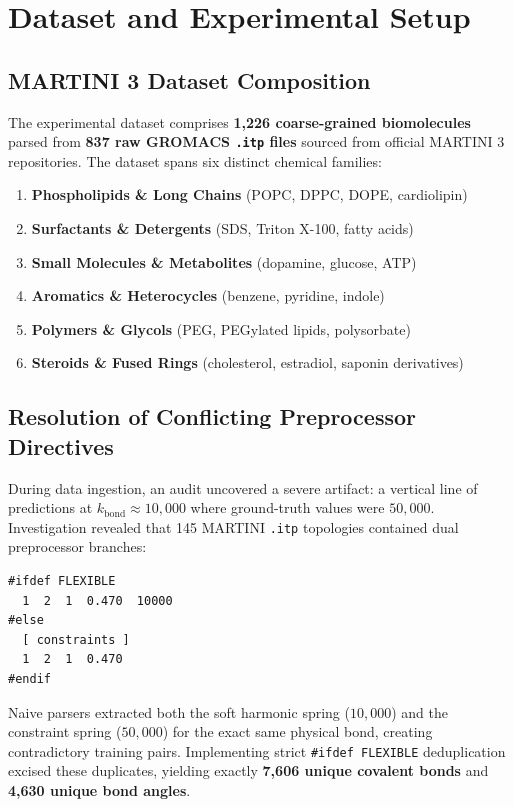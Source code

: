 \documentclass[10pt,journal,compsoc]{IEEEtran}
\begin{document}
\section{Dataset and Experimental Setup}
\label{sec:dataset}

\subsection{MARTINI 3 Dataset Composition}
The experimental dataset comprises \textbf{1,226 coarse-grained biomolecules} parsed from \textbf{837 raw GROMACS \texttt{.itp} files} sourced from official MARTINI 3 repositories. The dataset spans six distinct chemical families:
\begin{enumerate}
    \item \textbf{Phospholipids \& Long Chains} (POPC, DPPC, DOPE, cardiolipin)
    \item \textbf{Surfactants \& Detergents} (SDS, Triton X-100, fatty acids)
    \item \textbf{Small Molecules \& Metabolites} (dopamine, glucose, ATP)
    \item \textbf{Aromatics \& Heterocycles} (benzene, pyridine, indole)
    \item \textbf{Polymers \& Glycols} (PEG, PEGylated lipids, polysorbate)
    \item \textbf{Steroids \& Fused Rings} (cholesterol, estradiol, saponin derivatives)
\end{enumerate}

\subsection{Resolution of Conflicting Preprocessor Directives}
During data ingestion, an audit uncovered a severe artifact: a vertical line of predictions at $k_{\text{bond}} \approx 10{,}000$ where ground-truth values were $50{,}000$. Investigation revealed that 145 MARTINI \texttt{.itp} topologies contained dual preprocessor branches:
\begin{verbatim}
#ifdef FLEXIBLE
  1  2  1  0.470  10000
#else
  [ constraints ]
  1  2  1  0.470
#endif
\end{verbatim}
Naive parsers extracted both the soft harmonic spring ($10{,}000$) and the constraint spring ($50{,}000$) for the exact same physical bond, creating contradictory training pairs. Implementing strict \texttt{\#ifdef FLEXIBLE} deduplication excised these duplicates, yielding exactly \textbf{7,606 unique covalent bonds} and \textbf{4,630 unique bond angles}.
\end{document}
